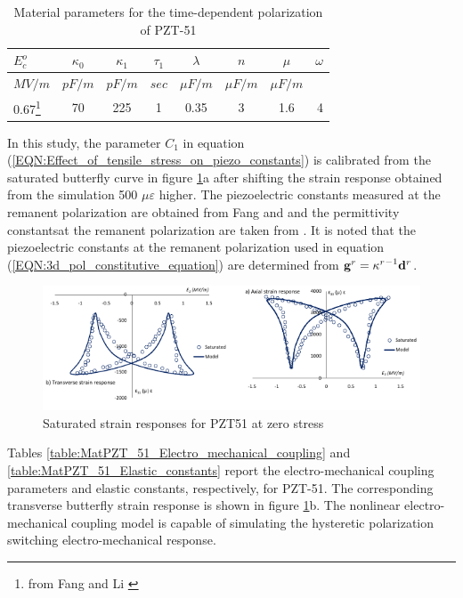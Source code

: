 \begin{table}   
\caption{Material parameters for the time-dependent polarization of PZT-51}
\centering
\begin{tabular}{l c c c c c c r}
\hline 
$E_c^o$ & $\kappa_0$ & $\kappa_1$ & $\tau_1$ & $\lambda$ & $ n $ & $\mu$&  $\omega$ \\ \hline
$MV/m$ & $pF/m$ & $pF/m$ &  $sec$ & $\mu F/m$ & $\mu F/m $& $\mu F/m $\\ 
0.67\footnote{from Fang and Li \cite{raey}}&70&225&1&0.35&3&1.6&4\\ \hline
\end{tabular}
\label{table:MatPZT_51}
\end{table}

In this study, the parameter $C_1$ in equation
(\ref{EQN:Effect_of_tensile_stress_on_piezo_constants}) is calibrated from the saturated butterfly curve in figure \ref{saturated_strain_responses_pzt51_zero_stress}a after shifting the strain response obtained from the simulation 500 $\mu \varepsilon$ higher.
The piezoelectric constants measured at the remanent polarization are obtained
from Fang and \cite{Li2004959} and the permittivity constantsat the remanent polarization are taken from \cite{Muliana2011}.
It is noted that the piezoelectric constants at the remanent polarization used in equation (\ref{EQN:3d_pol_constitutive_equation}) are determined from ${{\bf{g}}^r} = {{\mathbf{\kappa }}^r}^{ - 1}{{\bf{d}}^r}$. 
\begin{figure} 
\centering
\includegraphics[width=6.0in]{./chap_2_pol_sw/figures/saturated_strain_responses_pzt51_zero_stress.pdf} 
\caption{Saturated strain responses for PZT51 at zero stress}
\label{saturated_strain_responses_pzt51_zero_stress}
\end{figure}
Tables \ref{table:MatPZT_51_Electro_mechanical_coupling} and \ref{table:MatPZT_51_Elastic_constants} report the electro-mechanical coupling parameters and elastic constants, respectively, for PZT-51. 
The corresponding transverse butterfly strain response is shown in figure \ref{saturated_strain_responses_pzt51_zero_stress}b. 
The nonlinear electro-mechanical coupling model is capable of simulating the hysteretic polarization switching electro-mechanical response.

